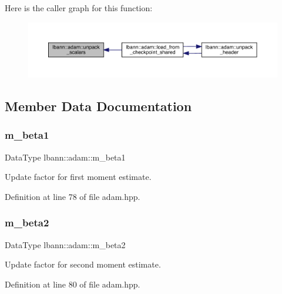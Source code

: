 Here is the caller graph for this function\+:\nopagebreak
\begin{figure}[H]
\begin{center}
\leavevmode
\includegraphics[width=350pt]{classlbann_1_1adam_a21a3d2bce0bac5e6c022c5d95ec6348b_icgraph}
\end{center}
\end{figure}


\subsection{Member Data Documentation}
\mbox{\label{classlbann_1_1adam_a73af15a28066edbfad9ba6a900746a19}} 
\subsubsection{\texorpdfstring{m\+\_\+beta1}{m\_beta1}}
{\footnotesize\ttfamily Data\+Type lbann\+::adam\+::m\+\_\+beta1\hspace{0.3cm}{\ttfamily [private]}}

Update factor for first moment estimate. 

Definition at line 78 of file adam.\+hpp.

\mbox{\label{classlbann_1_1adam_ab1f2a16b8eb7e265895ea9eef3fe87b2}} 
\subsubsection{\texorpdfstring{m\+\_\+beta2}{m\_beta2}}
{\footnotesize\ttfamily Data\+Type lbann\+::adam\+::m\+\_\+beta2\hspace{0.3cm}{\ttfamily [private]}}

Update factor for second moment estimate. 

Definition at line 80 of file adam.\+hpp.

\mbox{\label{classlbann_1_1adam_a53c3034e187da2720447bbb4f2b59a5d}} 

